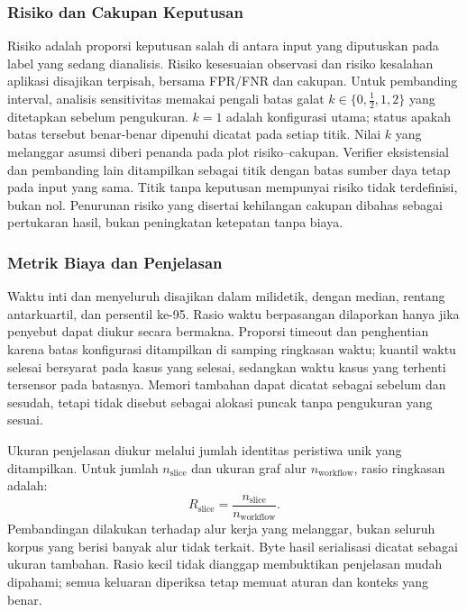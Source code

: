 \subsubsection{Risiko dan Cakupan Keputusan}
Risiko adalah proporsi keputusan salah di antara input yang diputuskan pada label yang sedang dianalisis. Risiko kesesuaian observasi dan risiko kesalahan aplikasi disajikan terpisah, bersama FPR/FNR dan cakupan. Untuk pembanding interval, analisis sensitivitas memakai pengali batas galat $k\in\{0,\tfrac12,1,2\}$ yang ditetapkan sebelum pengukuran. $k=1$ adalah konfigurasi utama; status apakah batas tersebut benar-benar dipenuhi dicatat pada setiap titik. Nilai $k$ yang melanggar asumsi diberi penanda pada plot risiko--cakupan. Verifier eksistensial dan pembanding lain ditampilkan sebagai titik dengan batas sumber daya tetap pada input yang sama. Titik tanpa keputusan mempunyai risiko tidak terdefinisi, bukan nol. Penurunan risiko yang disertai kehilangan cakupan dibahas sebagai pertukaran hasil, bukan peningkatan ketepatan tanpa biaya.

\subsubsection{Metrik Biaya dan Penjelasan}
Waktu inti dan menyeluruh disajikan dalam milidetik, dengan median, rentang antarkuartil, dan persentil ke-95. Rasio waktu berpasangan dilaporkan hanya jika penyebut dapat diukur secara bermakna. Proporsi timeout dan penghentian karena batas konfigurasi ditampilkan di samping ringkasan waktu; kuantil waktu selesai bersyarat pada kasus yang selesai, sedangkan waktu kasus yang terhenti tersensor pada batasnya. Memori tambahan dapat dicatat sebagai  sebelum dan sesudah, tetapi tidak disebut sebagai alokasi puncak tanpa pengukuran yang sesuai.

Ukuran penjelasan diukur melalui jumlah identitas peristiwa unik yang ditampilkan. Untuk jumlah $n_{\mathrm{slice}}$ dan ukuran graf alur $n_{\mathrm{workflow}}$, rasio ringkasan adalah:
\begin{equation}
  R_{\mathrm{slice}}=\frac{n_{\mathrm{slice}}}{n_{\mathrm{workflow}}}.
\end{equation}
Pembandingan dilakukan terhadap alur kerja yang melanggar, bukan seluruh korpus yang berisi banyak alur tidak terkait. Byte hasil serialisasi dicatat sebagai ukuran tambahan. Rasio kecil tidak dianggap membuktikan penjelasan mudah dipahami; semua keluaran diperiksa tetap memuat aturan dan konteks yang benar.


